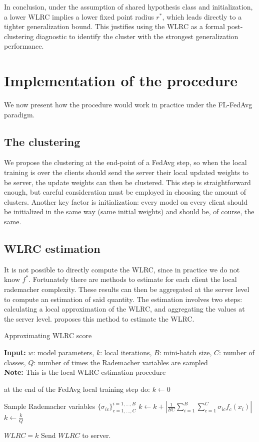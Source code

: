\documentclass{article}
\begin{document}
In conclusion, under the assumption of shared hypothesis class and initialization, a lower WLRC implies a lower fixed point radius \( r^* \), which leads directly to a tighter generalization bound. This justifies using the WLRC as a formal post-clustering diagnostic to identify the cluster with the strongest generalization performance.

\section{Implementation of the procedure}
We now present how the procedure would work in practice under the FL-FedAvg paradigm.
\subsection{The clustering}
We propose the clustering at the end-point of a FedAvg step, so when the local training is over the clients should send the server their local updated weights to be server, the update weights can then be clustered. This step is straightforward enough, but careful consideration must be employed in choosing the amount of clusters. Another key factor is initialization: every model on every client should be initialized in the same way (same initial weights) and should be, of course, the same. 

\subsection{WLRC estimation}
It is not possible to directly compute the WLRC, since in practice we do not know $f^*$. Fortunately there are methods to estimate for each client the local rademacher complexity. These results can then be aggregated at the server level to compute an estimation of said quantity.
The estimation involves two steps: calculating a local approximation of the WLRC, and aggregating the values at the server level. \cite{WLRC} proposes this method to estimate the WLRC.
\begin{algorithm}[H]
\caption{Approximating WLRC score}
\label{alg:fedalrc}
\textbf{Input:} $w$: model parameters, $k$: local iterations, $B$: mini-batch size, $C$: number of classes, $Q$: number of times the Rademacher variables are sampled\\
\textbf{Note:} This is the local WLRC estimation procedure

\begin{algorithmic}[1]
\STATE at the end of the FedAvg local training step do:
    \STATE $k \gets 0$

        \STATE Sample Rademacher variables $\{ \sigma_{ic} \}_{c=1,\ldots,C}^{i=1,\ldots,B}$
        \STATE $k \gets k + \left| \frac{1}{B C} \sum_{i=1}^B \sum_{c=1}^C \sigma_{ic} f_c(x_i) \right|$
    \ENDFOR
    \STATE $k \gets \frac{k}{Q}$

    \STATE $WLRC = k$ Send $WLRC$ to server.
\ENDFOR
\end{algorithmic}
\end{algorithm}
\end{document}
